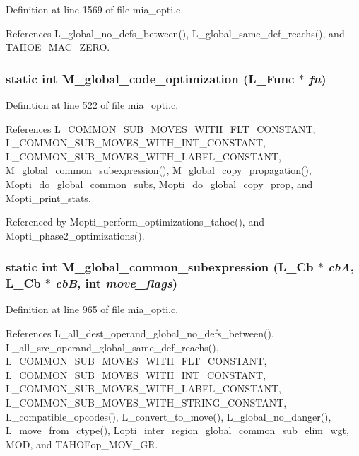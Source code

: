 Definition at line 1569 of file mia\_\-opti.c.

References L\_\-global\_\-no\_\-defs\_\-between(), L\_\-global\_\-same\_\-def\_\-reachs(), and TAHOE\_\-MAC\_\-ZERO.
\subsubsection{\setlength{\rightskip}{0pt plus 5cm}static int M\_\-global\_\-code\_\-optimization (L\_\-Func $\ast$ {\em fn})\hspace{0.3cm}{\tt  [static]}}\label{mia__opti_8c_efb384e57ee7a4b575333ba00dcc9af4}




Definition at line 522 of file mia\_\-opti.c.

References L\_\-COMMON\_\-SUB\_\-MOVES\_\-WITH\_\-FLT\_\-CONSTANT, L\_\-COMMON\_\-SUB\_\-MOVES\_\-WITH\_\-INT\_\-CONSTANT, L\_\-COMMON\_\-SUB\_\-MOVES\_\-WITH\_\-LABEL\_\-CONSTANT, M\_\-global\_\-common\_\-subexpression(), M\_\-global\_\-copy\_\-propagation(), Mopti\_\-do\_\-global\_\-common\_\-subs, Mopti\_\-do\_\-global\_\-copy\_\-prop, and Mopti\_\-print\_\-stats.

Referenced by Mopti\_\-perform\_\-optimizations\_\-tahoe(), and Mopti\_\-phase2\_\-optimizations().
\subsubsection{\setlength{\rightskip}{0pt plus 5cm}static int M\_\-global\_\-common\_\-subexpression (L\_\-Cb $\ast$ {\em cb\-A}, L\_\-Cb $\ast$ {\em cb\-B}, int {\em move\_\-flags})\hspace{0.3cm}{\tt  [static]}}\label{mia__opti_8c_120aab48a0f35d564a275f386ee97ff7}




Definition at line 965 of file mia\_\-opti.c.

References L\_\-all\_\-dest\_\-operand\_\-global\_\-no\_\-defs\_\-between(), L\_\-all\_\-src\_\-operand\_\-global\_\-same\_\-def\_\-reachs(), L\_\-COMMON\_\-SUB\_\-MOVES\_\-WITH\_\-FLT\_\-CONSTANT, L\_\-COMMON\_\-SUB\_\-MOVES\_\-WITH\_\-INT\_\-CONSTANT, L\_\-COMMON\_\-SUB\_\-MOVES\_\-WITH\_\-LABEL\_\-CONSTANT, L\_\-COMMON\_\-SUB\_\-MOVES\_\-WITH\_\-STRING\_\-CONSTANT, L\_\-compatible\_\-opcodes(), L\_\-convert\_\-to\_\-move(), L\_\-global\_\-no\_\-danger(), L\_\-move\_\-from\_\-ctype(), Lopti\_\-inter\_\-region\_\-global\_\-common\_\-sub\_\-elim\_\-wgt, MOD, and TAHOEop\_\-MOV\_\-GR.

